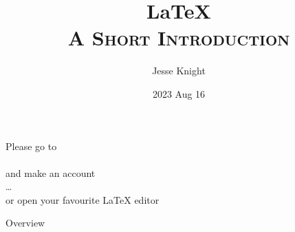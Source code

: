 \documentclass[11pt,aspectratio=169]{beamer}
\title[\LaTeX: A Short Introduction]{\LaTeX\\\textsc{\small{A Short Introduction}}}
\author[\href{\github}{\tiny\texttt{\github}}\hspace{0.2\linewidth}Jesse Knight]{Jesse Knight}
\institute{University of Toronto\\Libraries}
\date{2023 Aug 16}
\begin{document}
\begin{frame}
  \centering\Large
  Please go to
  \\
  \\
  and make an account
  \\\dots\\
  or open your favourite \LaTeX{} editor
\end{frame}
\begin{frame}
  \maketitle
\end{frame}
\begin{frame}[label=overview]{Overview}
  \tableofcontents
\end{frame}
\end{document}
